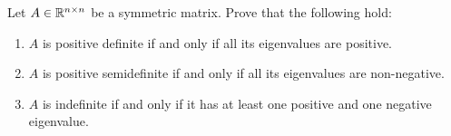 \documentclass{ExerciseSheet}
\newif\ifsolutions
\begin{document}







\vskip 0.5cm
\begin{problem}

Let $A\in \mathbb{R}^{n\times n}$ be a symmetric matrix. Prove that the following hold:
\begin{enumerate}
    \item $A$ is positive definite if and only if all its eigenvalues are positive.
    \item $A$ is positive semidefinite if and only if all its eigenvalues are non-negative.
    \item $A$ is indefinite if and only if it has at least one positive and one negative eigenvalue.
\end{enumerate}
\end{problem}
\end{document}
